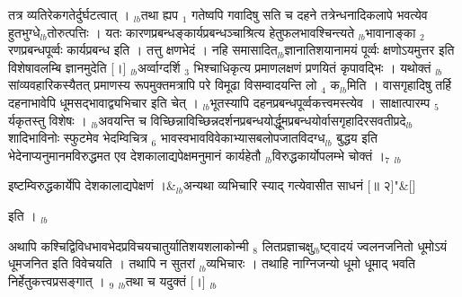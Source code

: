\documentclass[article,12pt,a4paper]{memoir}%
\newcounter{parCount}
\begin{document}
तत्र व्यतिरेकगतेर्दुर्घटत्वात् । {\tiny $_{lb}$}तथा ह्यप {\tiny $_{1}$} गतेष्वपि गवादिषु सति च दहने तत्रेन्धनादिकलापे भवत्येव हुतभुग्धे{\tiny $_{lb}$}तोरुत्पत्तिः । यतः कारणप्रबन्धङ्कार्यप्रबन्धञ्चाश्रित्य हेतुफलभावश्चिन्त्यते {\tiny $_{lb}$}भावानाङ्का {\tiny $_{2}$} रणप्रबन्धपूर्व्वः कार्यप्रबन्ध इति । तत्तु क्षणभेदं । नहि समासादित{\tiny $_{lb}$}ज्ञानातिशयानामयं पूर्व्वः क्षणोऽयमुत्तर इति विशेषावलम्बि ज्ञानमुदेति [।] {\tiny $_{lb}$}अर्व्वाग्दर्शि {\tiny $_{3}$} भिश्चाधिकृत्य प्रमाणलक्षणं प्रणयितं कृपावद्भिः । यथोक्तं {\tiny $_{lb}$}सांव्यवहारिकस्यैतत् प्रमाणस्य रूपमुक्तमत्रापि परे विमूढा विसम्वादयन्ति लो {\tiny $_{4}$} क{\tiny $_{lb}$}मिति । वासगृहादिषु तर्हि दहनाभावेपि धूमसद्भावाद्व्यभिचार इति चेत् । {\tiny $_{lb}$}भूतस्यापि दहनप्रबन्धपूर्व्वकत्त्वमस्त्येव । साक्षात्पारम्प {\tiny $_{5}$} र्यकृतस्तु विशेषः । {\tiny $_{lb}$}अवयन्ति च विच्छिन्नाविच्छिन्नदर्शनप्रबन्धयोर्द्धूमप्रबन्धयोर्वासगृहादिरसवतीप्रदे{\tiny $_{lb}$}शादिभाविनोः स्फुटमेव भेदम्विचित्र {\tiny $_{6}$} भावस्वभावविवेकाभ्यासबलोपजातविदग्ध{\tiny $_{lb}$} \leavevmode{} बुद्धय इति भेदेनाप्यनुमानमविरुद्धमत एव देशकालाद्यपेक्षमनुमानं कार्यहेतौ {\tiny $_{lb}$}विरुद्धकार्योपलम्भे चोक्तं ।{\tiny $_{7}$} {\tiny $_{lb}$} 
	    \pend%
	  
	    
	    \stanza[\smallbreak]
	  इष्टम्विरुद्धकार्येपि देशकालाद्यपेक्षणं ।&{\tiny $_{lb}$}अन्यथा व्यभिचारि स्याद् गत्येवासीत  साधनं [॥ २]{\normalfontlatin\large\qquad{}"}\&[\smallbreak]
	  
	  
	  
	    \pstart  \leavevmode%
	    \hphantom{.}
	   इति ।
	{}
	\pend%
      {\tiny $_{lb}$}

	  
	  \pstart \leavevmode%
	अथापि कश्चिद्विविधभावभेदप्रविचयचातुर्यातिशयशलाकोन्मी {\tiny $_{8}$} लितप्रज्ञाचक्षु{\tiny $_{lb}$}ष्ट्वादयं ज्वलनजनितो धूमोऽयं धूमजनित इति विवेचयति । तथापि न सुतरां {\tiny $_{lb}$}व्यभिचारः । तथाहि नाग्निजन्यो धूमो धूमाद् भवति निर्हेतुकत्त्वप्रसङ्गात् । {\tiny $_{9}$} \leavevmode{} {\tiny $_{lb}$}तथा च यदुक्तं [।] {\tiny $_{lb}$} 
	    \pend%
	  
\end{document}
